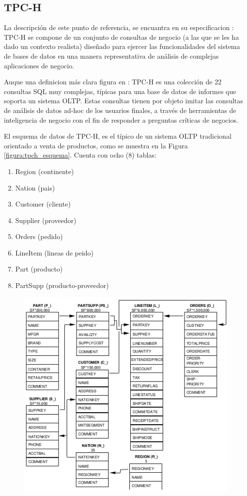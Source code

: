 \documentclass[11pt, twocolumns]{article}
\begin{document}
\begin{multicols}{2}
\section{TPC-H}
La descripción de este punto de referencia, se encuantra en su especificacion \cite{tpc2018benchmark}:
TPC-H se compone de un conjunto de consultas de negocio (a las que se les ha dado un contexto realista) diseñado para ejercer las funcionalidades del sistema de bases de datos en una manera representativa de análisis de complejas aplicaciones de negocio.
\par
Auque una definicion más clara figura en \cite{scalzo2018database}:
TPC-H es una colección de 22 consultas SQL muy complejas, típicas para una base de datos de informes que soporta un sistema OLTP. Estas consultas tienen por objeto imitar las consultas de análisis de datos ad-hoc
de los usuarios finales, a través de herramientas de inteligencia de negocio con el fin de responder a preguntas críticas de negocios.
\par
El esquema de datos de TPC-H, es el típico de un sistema OLTP tradicional orientado a venta de productos, como se muestra en la Figura \ref{figura:tpch_esquema}. Cuenta con ocho (8) tablas:
\begin{enumerate}
  \item Region (continente)
  \item Nation (pais)
  \item Customer (cliente)
  \item Supplier (proveedor)
  \item Orders (pedido)
  \item LineItem (lineas de peido)
  \item Part (producto)
  \item PartSupp (producto-proveedor)
\end{enumerate}
\begin{figure}[H]
  \includegraphics[scale=0.55]{tpch_esquema.png}

\end{figure}
\end{multicols}
\end{document}
